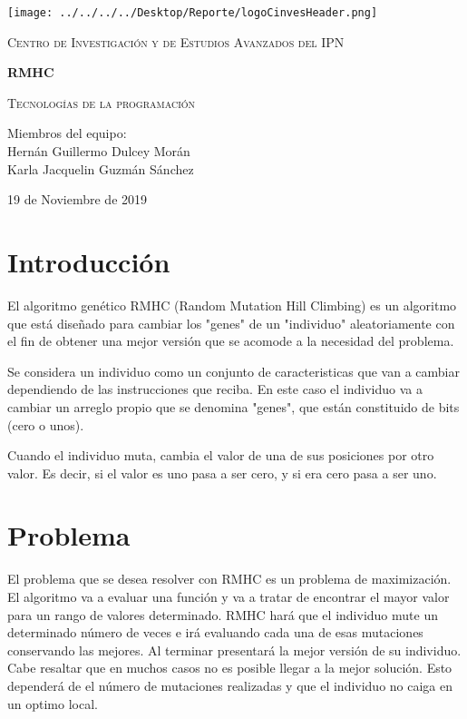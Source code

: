 \documentclass[10pt]{report}
\begin{document}
\begin{titlepage}
	\centering
	\texttt{[image: ../../../../Desktop/Reporte/logoCinvesHeader.png]} \par\vspace{2cm}
	{\scshape\LARGE Centro de Investigación y de Estudios Avanzados del IPN\par}
	\vspace{2cm}	
	{\huge\bfseries RMHC \par}
	\vspace{1.5cm}
	{\scshape\Large Tecnologías de la programación\par}
	\vspace{2cm}
	{\Large Miembros del equipo: \\Hernán Guillermo Dulcey Morán \\Karla Jacquelin Guzmán Sánchez\par}
	\vfill

	{\large 19 de Noviembre de 2019 \par}
\end{titlepage}


\section*{Introducción}

El algoritmo genético RMHC (Random Mutation Hill Climbing) es un algoritmo que está diseñado para cambiar los "genes" de un "individuo" aleatoriamente con el fin de obtener una mejor versión que se acomode a la necesidad del problema.

Se considera un individuo como un conjunto de caracteristicas que van a cambiar dependiendo de las instrucciones que reciba. En este caso el individuo va a cambiar un arreglo propio que se denomina "genes", que están constituido de bits (cero o unos). 

Cuando el individuo muta, cambia el valor de una de sus posiciones por otro valor. Es decir, si el valor es uno pasa a ser cero, y si era cero pasa a ser uno.

\section*{Problema}

El problema que se desea resolver con RMHC es un problema de maximización. El algoritmo va a evaluar una función y va a tratar de encontrar el mayor valor para un rango de valores determinado. RMHC hará que el individuo mute un determinado número de veces e irá evaluando cada una de esas mutaciones conservando las mejores. Al terminar presentará la mejor versión de su individuo. Cabe resaltar que en muchos casos no es posible llegar a la mejor solución. Esto dependerá de el número de mutaciones realizadas y que el individuo no caiga en un optimo local.
\end{document}
